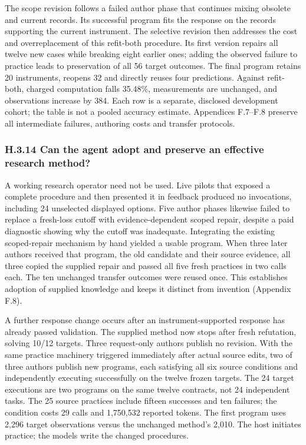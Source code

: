 \documentclass[twoside,11pt]{article}
\begin{document}
The scope revision follows a failed author phase that continues mixing obsolete
and current records. Its successful program fits the response on the records
supporting the current instrument. The selective revision then addresses the
cost and overreplacement of this refit-both procedure. Its first version repairs
all twelve new cases while breaking eight earlier ones; adding the observed
failure to practice leads to preservation of all 56 target outcomes. The final
program retains 20 instruments, reopens 32 and directly reuses four predictions.
Against refit-both, charged computation falls 35.48\%, measurements are unchanged,
and observations increase by 384. Each row is a separate, disclosed development
cohort; the table is not a pooled accuracy estimate. Appendices F.7–F.8 preserve
all intermediate failures, authoring costs and transfer protocols.


\subsubsection*{H.3.14 Can the agent adopt and preserve an effective research method?}

A working research operator need not be used. Live pilots that exposed a complete
procedure and then presented it in feedback produced no invocations, including
24 unselected displayed options. Five author phases likewise failed to replace a
fresh-loss cutoff with evidence-dependent scoped repair, despite a paid diagnostic
showing why the cutoff was inadequate. Integrating the existing scoped-repair
mechanism by hand yielded a usable program. When three later authors received
that program, the old candidate and their source evidence, all three copied the
supplied repair and passed all five fresh practices in two calls each. The ten
unchanged transfer outcomes were reused once. This establishes adoption of
supplied knowledge and keeps it distinct from invention (Appendix F.8).


A further response change occurs after an instrument-supported response has
already passed validation. The supplied method now stops after fresh refutation,
solving 10/12 targets. Three request-only authors publish no revision. With the
same practice machinery triggered immediately after actual source edits, two of
three authors publish new programs, each satisfying all six source conditions
and independently executing successfully on the twelve frozen targets. The 24
target executions are two programs on the same twelve contracts, not 24 independent
tasks. The 25 source practices include fifteen successes and ten failures; the
condition costs 29 calls and 1,750,532 reported tokens. The first program uses
2,296 target observations versus the unchanged method's 2,010. The host initiates
practice; the models write the changed procedures.
\end{document}

